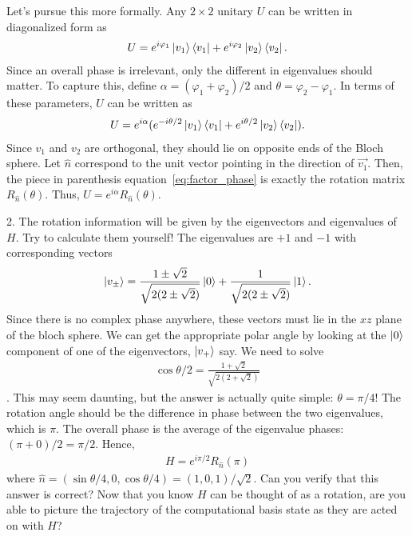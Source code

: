 \documentclass{book}
\begin{document}
    Let's pursue this more formally. Any $2\times2$ unitary $U$ can be written in diagonalized form as 
    \begin{align}
        U = e^{i\varphi_1} \ket{v_1}\bra{v_1} + e^{i\varphi_2} \ket{v_2}\bra{v_2}.
    \end{align}
    Since an overall phase is irrelevant, only the different in eigenvalues should matter. To capture this, define $\alpha = (\varphi_1 + \varphi_2)/2$ and $\theta = \varphi_2 - \varphi_1$. In terms of these parameters, $U$ can be written as 
    \begin{align} \label{eq:factor_phase}
        U = e^{i\alpha}(e^{-i\theta/2} \ket{v_1}\bra{v_1} + e^{i\theta/2} \ket{v_2}\bra{v_2}).
    \end{align}
    Since $v_1$ and $v_2$ are orthogonal, they should lie on opposite ends of the Bloch sphere. Let $\hat{n}$ correspond to the unit vector pointing in the direction of $\vec{v_1}$. Then, the piece in parenthesis equation~\eqref{eq:factor_phase} is exactly the rotation matrix $R_{\hat{n}}(\theta)$. Thus, $U = e^{i\alpha} R_{\hat{n}}(\theta)$. 
    
    2. The rotation information will be given by the eigenvectors and eigenvalues of $H$. Try to calculate them yourself! The eigenvalues are $+1$ and $-1$ with corresponding vectors 
    \begin{align}
        \ket{v_\pm} = \frac{1\pm\sqrt{2}}{\sqrt{2(2\pm\sqrt{2})}}\ket{0} + \frac{1}{\sqrt{2(2\pm\sqrt{2})}}\ket{1}.
    \end{align}
    Since there is no complex phase anywhere, these vectors must lie in the $xz$ plane of the bloch sphere. We can get the appropriate polar angle by looking at the $\ket{0}$ component of one of the eigenvectors, $\ket{v_+}$ say. We need to solve
    \begin{align}
        \cos\theta/2 = \frac{1 + \sqrt{2}}{\sqrt{2(2+\sqrt{2})}}
    \end{align}.
    This may seem daunting, but the answer is actually quite simple: $\theta = \pi/4$! The rotation angle should be the difference in phase between the two eigenvalues, which is $\pi$. The overall phase is the average of the eigenvalue phases: $(\pi + 0)/2 = \pi/2$. Hence,
    \begin{align}
        H = e^{i\pi/2} R_{\hat{n}}(\pi)
    \end{align}
    where $\hat{n} = (\sin\theta/4, 0, \cos\theta/4) = (1,0,1)/\sqrt{2}$. Can you verify that this answer is correct? Now that you know $H$ can be thought of as a rotation, are you able to picture the trajectory of the computational basis state as they are acted on with $H$?
    
\end{document}
